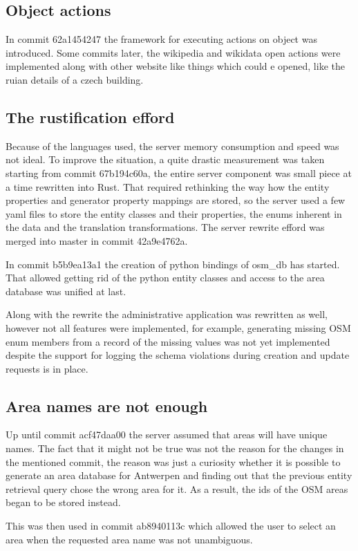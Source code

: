 \documentclass[nolof,digital]{fithesis3}
\begin{document}
\subsection{Object actions}
In commit 62a1454247 the framework for executing actions on object was introduced. Some commits later, the wikipedia and wikidata open actions were implemented along with other website like things which could e opened, like the ruian details of a czech building.
\subsection{The rustification efford}
Because of the languages used, the server memory consumption and speed was not ideal. To improve the situation, a quite drastic measurement was taken starting from commit 67b194c60a, the entire server component was small piece at a time rewritten into Rust. That required rethinking the way how the entity properties and generator property mappings are stored, so the server used a few yaml files to store the entity classes and their properties, the enums inherent in the data and the translation transformations. The server rewrite efford was merged into master in commit 42a9e4762a.

In commit b5b9ea13a1 the creation of python bindings of osm\_db has started. That allowed getting rid of the python entity classes and access to the area database was unified at last.

Along with the rewrite the administrative application was rewritten as well, however not all features were implemented, for example, generating missing OSM enum members from a record of the missing values was not yet implemented despite the support for logging the schema violations during creation and update requests is in place.
\subsection{Area names are not enough}
Up until commit acf47daa00 the server assumed that areas will have unique names. The fact that it might not be true was not the reason for the changes in the mentioned commit, the reason was just a curiosity whether it is possible to generate an area database for Antwerpen and finding out that the previous entity retrieval query chose the wrong area for it. As a result, the ids of the OSM areas began to be stored instead.

This was then used in commit ab8940113c which allowed the user to select an area when the requested area name was not unambiguous.
\end{document}

